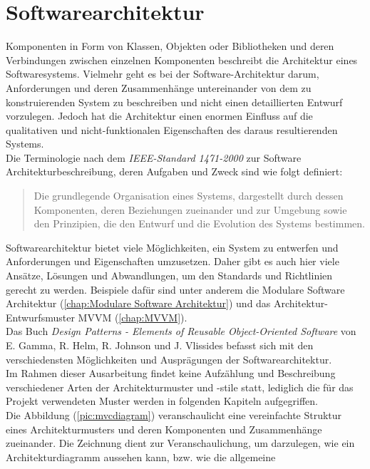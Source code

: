 \section{Softwarearchitektur}
\label{chap:Softwarearchitektur}
Komponenten in Form von Klassen, Objekten oder Bibliotheken und deren Verbindungen zwischen einzelnen Komponenten beschreibt die Architektur 
eines Softwaresystems. Vielmehr geht es bei der Software-Architektur darum, Anforderungen und deren Zusammenhänge untereinander von dem zu 
konstruierenden System zu beschreiben und nicht einen detaillierten Entwurf vorzulegen. Jedoch hat die Architektur einen enormen Einfluss 
auf die qualitativen und nicht-funktionalen Eigenschaften des daraus resultierenden Systems. 
\\ 
\linebreak
Die Terminologie nach dem \textit{IEEE-Standard 1471-2000} zur Software Architekturbeschreibung, deren Aufgaben und Zweck \cite{swarchitekturieee.2005} 
sind wie folgt definiert: 
\begin{quote}
    Die grundlegende Organisation eines Systems, dargestellt durch dessen Komponenten, deren Beziehungen zueinander und zur Umgebung sowie den 
    Prinzipien, die den Entwurf und die Evolution des Systems bestimmen. \cite{architektursw.2006f}
\end{quote}
Softwarearchitektur bietet viele Möglichkeiten, ein System zu entwerfen und Anforderungen und Eigenschaften umzusetzen. Daher gibt es auch 
hier viele Ansätze, Lösungen und Abwandlungen, um den Standards und Richtlinien gerecht zu werden. Beispiele dafür sind unter anderem die 
Modulare Software Architektur (\ref{chap:Modulare Software Architektur}) und das Architektur-Entwurfsmuster MVVM (\ref{chap:MVVM}).
\\
Das Buch \textit{Design Patterns - Elements of Reusable Object-Oriented Software} von E. Gamma, R. Helm, R. Johnson und J. Vlissides befasst 
sich mit den verschiedensten Möglichkeiten und Ausprägungen der Softwarearchitektur. 
\\ 
Im Rahmen dieser Ausarbeitung findet keine Aufzählung und Beschreibung verschiedener Arten der Architekturmuster und -stile statt, lediglich die 
für das Projekt verwendeten Muster werden in folgenden Kapiteln aufgegriffen. 
\\ 
\linebreak
Die Abbildung (\ref{pic:mvcdiagram}) veranschaulicht eine vereinfachte Struktur eines Architekturmusters und deren Komponenten und Zusammenhänge 
zueinander. Die Zeichnung dient zur Veranschaulichung, um darzulegen, wie ein Architekturdiagramm aussehen kann, bzw. wie die allgemeine 
